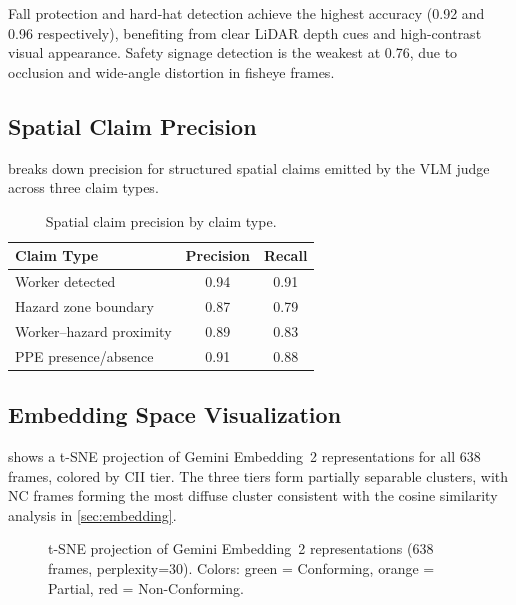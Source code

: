 \documentclass[sigconf,nonacm]{acmart}
\begin{document}
Fall protection and hard-hat detection achieve the highest accuracy
(0.92 and 0.96 respectively), benefiting from clear LiDAR depth cues
and high-contrast visual appearance.
Safety signage detection is the weakest at 0.76, due to occlusion and
wide-angle distortion in fisheye frames.

\subsection{Spatial Claim Precision}

 breaks down precision for structured spatial
claims emitted by the VLM judge across three claim types.

\begin{table}[t]
  \centering
  \caption{Spatial claim precision by claim type.}
  \label{tab:spatial_precision}
  \begin{tabular}{@{}lcc@{}}
    \toprule
    \textbf{Claim Type} & \textbf{Precision} & \textbf{Recall} \\
    \midrule
    Worker detected            & 0.94 & 0.91 \\
    Hazard zone boundary       & 0.87 & 0.79 \\
    Worker--hazard proximity   & 0.89 & 0.83 \\
    PPE presence/absence       & 0.91 & 0.88 \\
    \bottomrule
  \end{tabular}
\end{table}

\subsection{Embedding Space Visualization}

 shows a t-SNE projection of Gemini Embedding~2
representations for all 638 frames, colored by CII tier.
The three tiers form partially separable clusters, with NC frames
forming the most diffuse cluster consistent with the cosine similarity
analysis in \cref{sec:embedding}.

\begin{figure}[t]
  \centering
  \fbox{\rule{0pt}{5cm}\rule{0.9\linewidth}{0pt}}
  \caption{t-SNE projection of Gemini Embedding~2 representations
           (638 frames, perplexity=30).
           Colors: \textcolor{green!70!black}{green} = Conforming,
           \textcolor{orange!80!black}{orange} = Partial,
           \textcolor{red!70!black}{red} = Non-Conforming.}
  \label{fig:tsne}
\end{figure}
\end{document}
